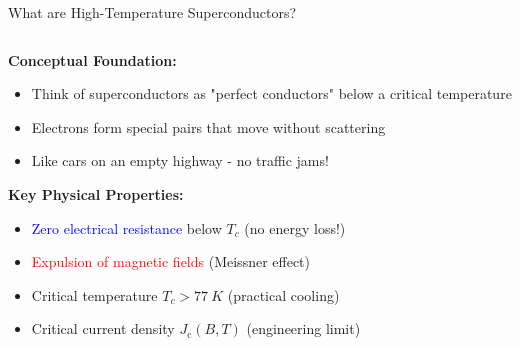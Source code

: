 \documentclass[aspectratio=169,xcolor={table,dvipsnames}]{beamer}
\newcommand{\Kelvin}[1]{#1~K}
\newcommand{\Jc}{J_\text{c}}
\begin{document}
\begin{frame}{What are High-Temperature Superconductors?}
    \begin{columns}
        \begin{column}{0.6\textwidth}
            \textbf{Conceptual Foundation:}
            \begin{itemize}
                \item Think of superconductors as "perfect conductors" below a critical temperature
                \item Electrons form special pairs that move without scattering
                \item Like cars on an empty highway - no traffic jams!
            \end{itemize}
            
            \vspace{0.3cm}
            \textbf{Key Physical Properties:}
            \begin{itemize}
                \item \textcolor{blue}{Zero electrical resistance} below $T_c$ (no energy loss!)
                \item \textcolor{red}{Expulsion of magnetic fields} (Meissner effect)
                \item Critical temperature $T_c > \Kelvin{77}$ (practical cooling)
                \item Critical current density $\Jc(B,T)$ (engineering limit)
            \end{itemize}
            

\end{column}
\end{columns}
\end{frame}
\end{document}
